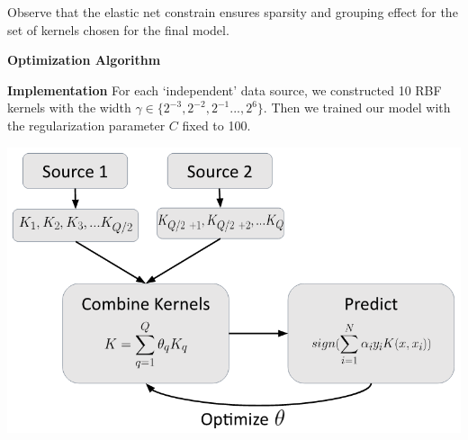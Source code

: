 \documentclass{article}
\begin{document}
Observe that the elastic net constrain ensures sparsity and grouping effect for the set of kernels chosen for the final model.

\textbf{Optimization Algorithm}

\vspace{10 mm}
\textbf{Implementation}
For each `independent' data source, we constructed 10 RBF kernels with the width $\gamma \in \{2^{-3}, 2^{-2}, 2^{-1} ..., 2^{6}\}$. Then we trained our model with the regularization parameter $C$ fixed to 100.

\begin{minipage}{\textwidth}
    \centering
    \includegraphics[scale=.4]{implementation_flowchart.png}
    \label{fig:implementation_flowchart}
\end{minipage}
\end{document}

